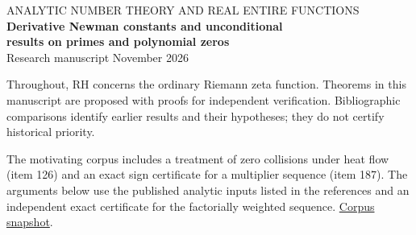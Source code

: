 \documentclass[11pt,a4paper]{article}
\begin{document}
\thispagestyle{plain}
\begin{center}
{\small\sffamily\color{inkblue} ANALYTIC NUMBER THEORY AND REAL ENTIRE FUNCTIONS}\\[10pt]
{\LARGE\bfseries Derivative Newman constants and unconditional}\\[4pt]
{\LARGE\bfseries results on primes and polynomial zeros}\\[9pt]
{\small Research manuscript  November 2026}
\end{center}
\begin{abstract}
The derivative de Bruijn--Newman constants of Ki, Kim and Lee are
nonnegative in every order and decrease to zero. Under the ordinary
Riemann hypothesis they are all zero. The negative-time proof transfers
Dobner's approximation to fixed linear differential operators and yields
a positive lower bound for the number of distinct zeros per unit height
in a logarithmically displaced strip. Littlewood's oscillation theorem
refutes the 2010 monotonicity conjecture of Choie, Planat and Sol\'e
without a prime-gap hypothesis. Both associated primorial ratios have
arbitrarily long common runs in each direction. We also obtain
unbounded signed oscillations on the primes in the Zhang race without
assuming RH. For factorially weighted polynomial multipliers we
characterize exactly which polynomials with nonnegative coefficients
give complex zero decreasing sequences, settling a question of
Csordas and Forg\'acs. We give
an exact degree-72 counterexample for their specified quadratic.
For permuted gaps we prove Tom\'as Garc\'ia's proposed sharp upper
constant and quantify, without RH, how rarely a permutation of Farey
gaps has discrepancy as small as the native order.
\end{abstract}
\tableofcontents
\medskip
\noindent Throughout, RH concerns the ordinary Riemann zeta function.
Theorems in this manuscript are proposed with proofs for independent
verification. Bibliographic comparisons identify earlier results and
their hypotheses; they do not certify historical priority.
\par\smallskip
\noindent The motivating corpus includes a treatment of zero collisions
under heat flow (item 126) and an exact sign certificate for a multiplier
sequence (item 187). The arguments below use the published analytic inputs
listed in the references and an independent exact certificate for the
factorially weighted sequence. \href{https://github.com/QEEDDD/Verifiable-Mathematical-Reasoning-Corpus/tree/c2ac34ea4622778187173f41bb1996deee8081b7}{Corpus snapshot}.
\newpage
\end{document}

